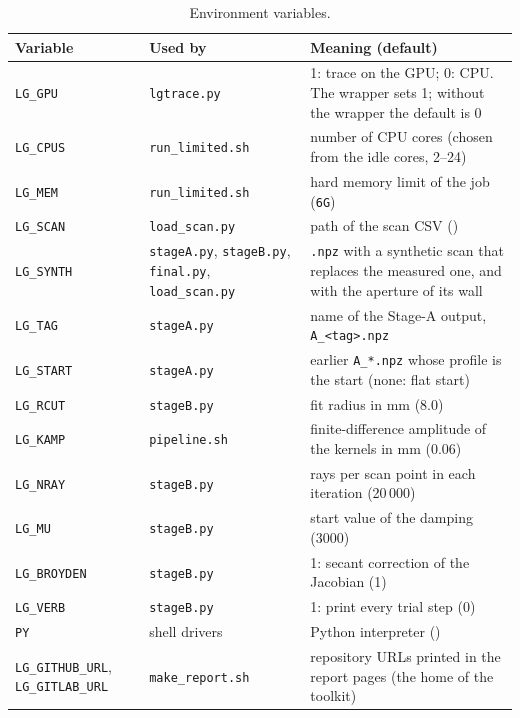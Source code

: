\documentclass[11pt,a4paper]{article}
\newcommand{\code}[1]{\texttt{#1}}
\begin{document}
\begin{table}[H]
\caption{Environment variables.}\label{tab:env}
\begin{tabularx}{\textwidth}{@{}L{2.6cm}L{3.4cm}Y@{}}
\toprule
Variable & Used by & Meaning (default) \\
\midrule
\code{LG\_GPU} & \code{lgtrace.py} & 1: trace on the GPU; 0: CPU. The wrapper sets 1; without the wrapper the default is 0 \\
\code{LG\_CPUS} & \code{run\_limited.sh} & number of CPU cores (chosen from the idle cores, 2--24) \\
\code{LG\_MEM} & \code{run\_limited.sh} & hard memory limit of the job (\code{6G}) \\
\code{LG\_SCAN} & \code{load\_scan.py} & path of the scan CSV () \\
\code{LG\_SYNTH} & \code{stageA.py}, \code{stageB.py}, \code{final.py}, \code{load\_scan.py} & \code{.npz} with a synthetic scan that replaces the measured one, and with the aperture of its wall \\
\code{LG\_TAG} & \code{stageA.py} & name of the Stage-A output, \code{A\_<tag>.npz} \\
\code{LG\_START} & \code{stageA.py} & earlier \code{A\_*.npz} whose profile is the start (none: flat start) \\
\code{LG\_RCUT} & \code{stageB.py} & fit radius in mm (8.0) \\
\code{LG\_KAMP} & \code{pipeline.sh} & finite-difference amplitude of the kernels in mm (0.06) \\
\code{LG\_NRAY} & \code{stageB.py} & rays per scan point in each iteration (20\,000) \\
\code{LG\_MU} & \code{stageB.py} & start value of the damping (3000) \\
\code{LG\_BROYDEN} & \code{stageB.py} & 1: secant correction of the Jacobian (1) \\
\code{LG\_VERB} & \code{stageB.py} & 1: print every trial step (0) \\
\code{PY} & shell drivers & Python interpreter () \\
{\small\code{LG\_GITHUB\_URL}, \code{LG\_GITLAB\_URL}} & \code{make\_report.sh} & repository URLs printed in the report pages (the home of the toolkit) \\
\bottomrule
\end{tabularx}
\end{table}

\end{document}
